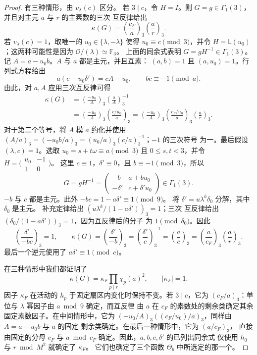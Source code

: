 \documentclass[11pt,a4paper]{article}
\numberwithin{equation}{section}
\numberwithin{figure}{section}
\theoremstyle{definition}
\theoremstyle{remark}
\begin{document}
\begin{proof}
有三种情形，由 $v_\lambda(c)$ 区分。
若 $3\mid c$，令 $H=I$。则 $G=g\in\Gamma_1(3)$，并且对主元 $a$ 与 $r$ 的主素数的三次
互反律给出
\begin{equation}\label{eq:reflection-cusp-case-zero}
 \kappa(G)=\left(\frac{c_F}{a}\right)_3
             \left(\frac ar\right)_3.
\end{equation}
若 $v_\lambda(c)=1$，取唯一的 $u_0\in\{\lambda,-\lambda\}$
使得 $u_0\equiv c\pmod3$，并令 $H=\mathsf L(u_0)$；这两种可能性是因为
$\mathcal O/(\lambda)\simeq\mathbb F_3$。
上面的同余式表明 $G=gH^{-1}\in\Gamma_1(3)$。
记 $A=a-u_0b$。$A$ 与 $a$ 都是主元，并且互素：
$(a,b)=1$ 且 $(a,u_0)=1$。行列式方程给出
\[
 a(c-u_0\delta')=cA-u_0,
 \qquad bc\equiv-1\pmod a.
\]
由此，对 $a,A$ 应用三次互反律可得
\[
 \begin{split}
 \kappa(G)
 &=\left(\frac{-u_0}{A}\right)_3
          \left(\frac aA\right)_3^{-1}\\
 &=\left(\frac{-u_0}{A}\right)_3
          \left(\frac{c/u_0}{a}\right)_3
  =\left(\frac{-u_0}{A}\right)_3
          \left(\frac{c_F/u_0}{a}\right)_3
          \left(\frac ar\right)_3.
 \end{split}
\]
对于第二个等号，将 $A$ 模 $a$ 约化并使用
$(A/a)_3=(-u_0b/a)_3=(u_0/a)_3(c/a)_3^{-1}$；$-1$ 的三次符号
为一。最后假设 $(\lambda,c)=1$。选取
$u_0=s+t\omega\equiv a\pmod3$ 且 $0\le s,t<3$，并令
$H=\bigl(\begin{smallmatrix}u_0&-1\\1&0\end{smallmatrix}\bigr)$。
这里 $c\equiv1$，$\delta'\equiv0$，且 $b\equiv-1\pmod3$，所以
\[
 G=gH^{-1}=\begin{pmatrix}-b&a+bu_0\\-\delta'&c+\delta'u_0\end{pmatrix}
       \in\Gamma_1(3).
\]
$-b$ 与 $c$ 都是主元。此外 $-bc=1-a\delta'\equiv1\pmod9$。
将 $\delta'=u\lambda^k\delta_0$ 分解，其中 $\delta_0$ 是主元。
补充定律给出 $(u\lambda^k/(1-a\delta'))_3=1$；三次
互反律给出 $(\delta_0/(1-a\delta'))_3=1$，因为互反律后的分子
为 $1\pmod{\delta_0}$。因此
\[
 \left(\frac{\delta'}{-bc}\right)_3=1,
 \qquad
 \kappa(G)=\left(\frac{\delta'}{-b}\right)_3
          =\left(\frac{\delta'}c\right)_3^{-1}
          =\left(\frac ac\right)_3
          =\left(\frac a{c_F}\right)_3\left(\frac ar\right)_3.
\]
最后一个逆元使用了 $a\delta'\equiv1\pmod c$。

在三种情形中我们都证明了
\begin{equation}\label{eq:reflection-multiplier}
 \kappa(G)=\kappa_F\prod_{p\mid r}\chi_p(a)^2,
 \qquad |\kappa_F|=1.
\end{equation}
因子 $\kappa_F$ 在活动的 $h_p$ 于固定扇区内变化时保持不变。若 $3\mid c$，它为 $(c_F/a)_3$：单位与
$\lambda$ 幂因子由 $a\bmod9$ 确定，而互反律
由 $a$ 在 $c_F$ 的素数处的剩余类确定其余固定素数因子。在中间情形中，它为
$(-u_0/A)_3((c_F/u_0)/a)_3$，同样由 $A=a-u_0b$ 与 $a$ 的固定
剩余类确定。在最后一种情形中，它为 $(a/c_F)_3$，
直接由固定的分母 $c_F$ 与
$a\bmod c_F$ 确定。因此，$a,b,c,\delta'$ 的已列出同余式
仅使用 $h_0$ 与 $r\bmod M^2$ 就确定了 $\kappa_F$。
它们也确定了三个函数 $\Theta_b$ 中所选定的那一个。


\end{proof}
\end{document}
